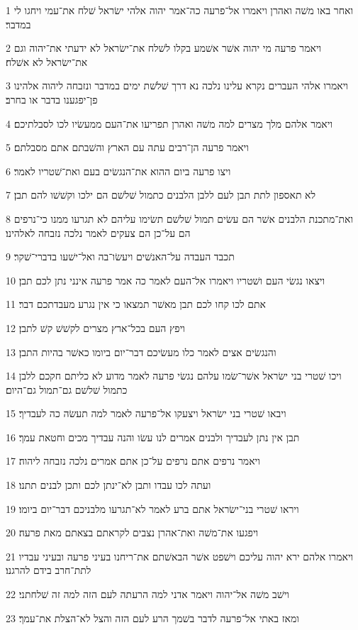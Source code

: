 \par 1 ואחר באו משׁה ואהרן ויאמרו אל־פרעה כה־אמר יהוה אלהי ישׂראל שׁלח את־עמי ויחגו לי במדבר׃
\par 2 ויאמר פרעה מי יהוה אשׁר אשׁמע בקלו לשׁלח את־ישׂראל לא ידעתי את־יהוה וגם את־ישׂראל לא אשׁלח׃
\par 3 ויאמרו אלהי העברים נקרא עלינו נלכה נא דרך שׁלשׁת ימים במדבר ונזבחה ליהוה אלהינו פן־יפגענו בדבר או בחרב׃
\par 4 ויאמר אלהם מלך מצרים למה משׁה ואהרן תפריעו את־העם ממעשׂיו לכו לסבלתיכם׃
\par 5 ויאמר פרעה הן־רבים עתה עם הארץ והשׁבתם אתם מסבלתם׃
\par 6 ויצו פרעה ביום ההוא את־הנגשׂים בעם ואת־שׁטריו לאמר׃
\par 7 לא תאספון לתת תבן לעם ללבן הלבנים כתמול שׁלשׁם הם ילכו וקשׁשׁו להם תבן׃
\par 8 ואת־מתכנת הלבנים אשׁר הם עשׂים תמול שׁלשׁם תשׂימו עליהם לא תגרעו ממנו כי־נרפים הם על־כן הם צעקים לאמר נלכה נזבחה לאלהינו׃
\par 9 תכבד העבדה על־האנשׁים ויעשׂו־בה ואל־ישׁעו בדברי־שׁקר׃
\par 10 ויצאו נגשׂי העם ושׁטריו ויאמרו אל־העם לאמר כה אמר פרעה אינני נתן לכם תבן׃
\par 11 אתם לכו קחו לכם תבן מאשׁר תמצאו כי אין נגרע מעבדתכם דבר׃
\par 12 ויפץ העם בכל־ארץ מצרים לקשׁשׁ קשׁ לתבן׃
\par 13 והנגשׂים אצים לאמר כלו מעשׂיכם דבר־יום ביומו כאשׁר בהיות התבן׃
\par 14 ויכו שׁטרי בני ישׂראל אשׁר־שׂמו עלהם נגשׂי פרעה לאמר מדוע לא כליתם חקכם ללבן כתמול שׁלשׁם גם־תמול גם־היום׃
\par 15 ויבאו שׁטרי בני ישׂראל ויצעקו אל־פרעה לאמר למה תעשׂה כה לעבדיך׃
\par 16 תבן אין נתן לעבדיך ולבנים אמרים לנו עשׂו והנה עבדיך מכים וחטאת עמך׃
\par 17 ויאמר נרפים אתם נרפים על־כן אתם אמרים נלכה נזבחה ליהוה׃
\par 18 ועתה לכו עבדו ותבן לא־ינתן לכם ותכן לבנים תתנו׃
\par 19 ויראו שׁטרי בני־ישׂראל אתם ברע לאמר לא־תגרעו מלבניכם דבר־יום ביומו׃
\par 20 ויפגעו את־משׁה ואת־אהרן נצבים לקראתם בצאתם מאת פרעה׃
\par 21 ויאמרו אלהם ירא יהוה עליכם וישׁפט אשׁר הבאשׁתם את־ריחנו בעיני פרעה ובעיני עבדיו לתת־חרב בידם להרגנו׃
\par 22 וישׁב משׁה אל־יהוה ויאמר אדני למה הרעתה לעם הזה למה זה שׁלחתני׃
\par 23 ומאז באתי אל־פרעה לדבר בשׁמך הרע לעם הזה והצל לא־הצלת את־עמך׃

